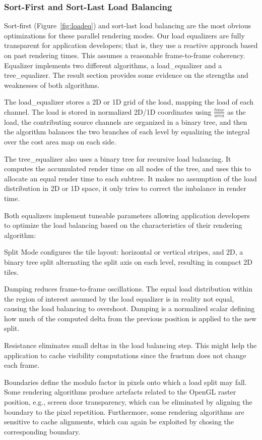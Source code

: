 \documentclass[10pt,journal,compsoc]{IEEEtran}
\newcommand{\fig}[1]{Figure~\ref{#1}}
\begin{document}
\subsubsection{Sort-First and Sort-Last Load Balancing}

Sort-first (\fig{fig:loadeq}) and sort-last load balancing are the most obvious
optimizations for these parallel rendering modes. Our load equalizers are fully
transparent for application developers; that is, they use a reactive approach
based on past rendering times. This assumes a reasonable frame-to-frame
coherency. Equalizer implements two different algorithms, a
\textsf{load\_equalizer} and a \textsf{tree\_equalizer}. The result section
provides some evidence on the strengths and weaknesses of both algorithms.

The \textsf{load\_equalizer} stores a 2D or 1D grid of the load, mapping the
load of each channel. The load is stored in normalized 2D/1D coordinates using
$\frac{time}{area}$ as the load, the contributing source channels are organized
in a binary tree, and then the algorithm balances the two branches of each level
by equalizing the integral over the cost area map on each side.

The \textsf{tree\_equalizer} also uses a binary tree for recursive load
balancing. It computes the accumulated render time on all nodes of the tree, and
uses this to allocate an equal render time to each subtree. It makes no
assumption of the load distribution in 2D or 1D space, it only tries to correct
the imbalance in render time.

Both equalizers implement tuneable parameters allowing application developers to
optimize the load balancing based on the characteristics of their rendering
algorithm:

\begin{compactdesc}
\item[Split Mode] configures the tile layout: horizontal or vertical stripes,
and 2D, a binary tree split alternating the split axis on each level, resulting
in compact 2D tiles.
\item[Damping] reduces frame-to-frame oscillations. The equal load distribution
within the region of interest assumed by the load equalizer is in reality not
equal, causing the load balancing to overshoot. Damping is a normalized scalar
defining how much of the computed delta from the previous position is applied to
the new split.
\item[Resistance] eliminates small deltas in the load balancing step. This might
help the application to cache visibility computations since the frustum does not
change each frame.
\item[Boundaries] define the modulo factor in pixels onto which a load split may
fall. Some rendering algorithms produce artefacts related to the OpenGL raster
position, e.g., screen door transparency, which can be eliminated by aligning
the boundary to the pixel repetition. Furthermore, some rendering algorithms are
sensitive to cache alignments, which can again be exploited by chosing the
corresponding boundary.
\end{compactdesc}
\end{document}
